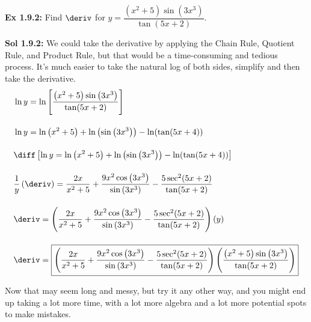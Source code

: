\begin{tcolorbox}[example]
    \textbf{Ex 1.9.2: } Find $\deriv$ for $y = \dfrac{\left(x^2 + 5\right)\sin \left(3x^3\right)}{\tan (5x + 2)}$.
\end{tcolorbox}
\begin{tcolorbox}[solution]
    \textbf{Sol 1.9.2: } We could take the derivative by applying the Chain Rule, Quotient Rule, and Product Rule, but that would be a time-consuming and tedious process. It's much easier to take the natural log of both sides, simplify and then take the derivative. \begin{align*}
        & \ln y = \ln\left[\dfrac{\left(x^2 + 5\right)\sin \left(3x^3\right)}{\tan (5x + 2)}\right] \\[11pt]
        & \ln y = \ln \left(x^2 + 5\right) + \ln \left(\sin \left(3x^3\right)\right) - \ln (\tan (5x + 4)) \\[11pt]
        & \diff \left[\ln y = \ln \left(x^2 + 5\right) + \ln \left(\sin \left(3x^3\right)\right) - \ln (\tan (5x + 4))\right] \\[11pt]
        & \dfrac{1}{y}\left(\deriv\right) = \dfrac{2x}{x^2 + 5} + \dfrac{9x^2\cos \left(3x^3\right)}{\sin \left(3x^3\right)} - \dfrac{5\sec^2 (5x + 2)}{\tan (5x + 2)} \\[11pt]
        & \deriv = \left(\dfrac{2x}{x^2 + 5} + \dfrac{9x^2\cos \left(3x^3\right)}{\sin \left(3x^3\right)} - \dfrac{5\sec^2 (5x + 2)}{\tan (5x + 2)}\right)(y) \\[11pt]
        & \deriv = \boxed{\left(\dfrac{2x}{x^2 + 5} + \dfrac{9x^2\cos \left(3x^3\right)}{\sin \left(3x^3\right)} - \dfrac{5\sec^2 (5x + 2)}{\tan (5x + 2)}\right)\left(\dfrac{\left(x^2 + 5\right)\sin \left(3x^3\right)}{\tan (5x + 2)}\right)}
    \end{align*}
\end{tcolorbox} 

Now that may seem long and messy, but try it any other way, and you might end up taking a lot more time, with a lot more algebra and a lot more potential spots to make mistakes. \par

